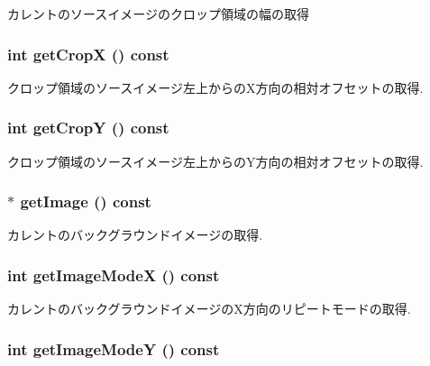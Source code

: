 カレントのソースイメージのクロップ領域の幅の取得 \hypertarget{classm3g_1_1Background_d0ba0211183decc8f0459ca598b12912}{
\subsubsection[{getCropX}]{\setlength{\rightskip}{0pt plus 5cm}int getCropX () const}}
\label{classm3g_1_1Background_d0ba0211183decc8f0459ca598b12912}


クロップ領域のソースイメージ左上からのX方向の相対オフセットの取得. \hypertarget{classm3g_1_1Background_9ef03b219415a1f08aef6745ad5d87d0}{
\subsubsection[{getCropY}]{\setlength{\rightskip}{0pt plus 5cm}int getCropY () const}}
\label{classm3g_1_1Background_9ef03b219415a1f08aef6745ad5d87d0}


クロップ領域のソースイメージ左上からのY方向の相対オフセットの取得. \hypertarget{classm3g_1_1Background_a8c0193b0e7d47d4b5c9f60df24c44f5}{
\subsubsection[{getImage}]{ $\ast$ getImage () const}}
\label{classm3g_1_1Background_a8c0193b0e7d47d4b5c9f60df24c44f5}


カレントのバックグラウンドイメージの取得. \hypertarget{classm3g_1_1Background_0dd60d498f4d50d8808c0b3ad61bc9e8}{
\subsubsection[{getImageModeX}]{\setlength{\rightskip}{0pt plus 5cm}int getImageModeX () const}}
\label{classm3g_1_1Background_0dd60d498f4d50d8808c0b3ad61bc9e8}


カレントのバックグラウンドイメージのX方向のリピートモードの取得. \hypertarget{classm3g_1_1Background_a8d38d66f133ae417956a5dc5f84551d}{
\subsubsection[{getImageModeY}]{\setlength{\rightskip}{0pt plus 5cm}int getImageModeY () const}}
\label{classm3g_1_1Background_a8d38d66f133ae417956a5dc5f84551d}



